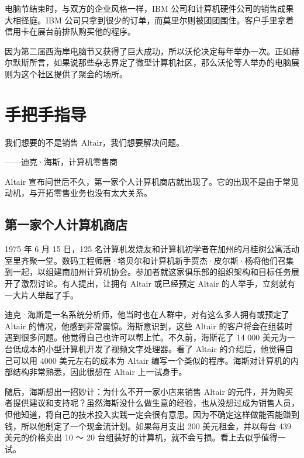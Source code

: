 \documentclass[12pt,UTF8]{ctexbook}
\begin{document}
电脑节结束时，与双方的企业风格一样，IBM 公司和计算机硬件公司的销售成果大相径庭。IBM 公司只拿到很少的订单，而莫里尔则被团团围住。客户手里拿着信用卡在展台前排队购买他的程序。

因为第二届西海岸电脑节又获得了巨大成功，所以沃伦决定每年举办一次。正如赫尔默斯所言，如果说那些杂志界定了微型计算机社区，那么沃伦等人举办的电脑展则为这个社区提供了聚会的场所。





\section{手把手指导}


我们想要的不是销售 Altair，我们想要解决问题。

——迪克·海斯，计算机零售商



Altair 宣布问世后不久，第一家个人计算机商店就出现了。它的出现不是由于常见动机，与开拓零售业务也没有太大关系。





\subsection{第一家个人计算机商店}


1975 年 6 月 15 日，125 名计算机发烧友和计算机初学者在加州的月桂树公寓活动室里齐聚一堂。数码工程师唐·塔贝尔和计算机新手贾杰·皮尔斯·杨将他们召集到一起，以组建南加州计算机协会。参加者就这家俱乐部的组织架构和目标任务展开了激烈讨论。有人提出，让拥有 Altair 或已经预定 Altair 的人举手，立刻就有一大片人举起了手。

迪克·海斯是一名系统分析师，他当时也在人群中，对有这么多人拥有或预定了 Altair 的情况，他感到非常震惊。海斯意识到，这些 Altair 的客户将会在组装时遇到很多问题。他觉得自己也许可以帮上忙。不久前，海斯花了 14 000 美元为一台低成本的小型计算机开发了视频文字处理器。看了 Altair 的介绍后，他觉得自己可以用 4000 美元左右的成本为 Altair 编写一个类似的程序。海斯对计算机的内部结构非常熟悉，因此很想在 Altair 上一试身手。

随后，海斯想出一招妙计：为什么不开一家小店来销售 Altair 的元件，并为购买者提供建议和支持呢？虽然海斯没什么做生意的经验，也从没想过成为销售人员，但他知道，将自己的技术投入实践一定会很有意思。因为不确定这样做能否能赚到钱，所以他制定了一个现金流计划。如果每月支出 200 美元租金，并以每台 439 美元的价格卖出 10 ～ 20 台组装好的计算机，就不会亏损。看上去似乎值得一试。
\end{document}
